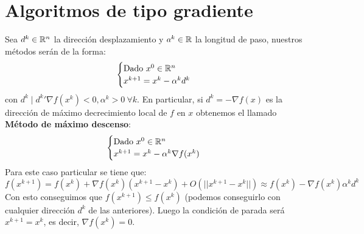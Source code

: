 \documentclass[MIOP.tex]{subfiles}
\begin{document}
\section{Algoritmos de tipo gradiente}
Sea $d^k \in\mathbb{R}^n$ la dirección desplazamiento y $a^k \in \mathbb{R}$ la longitud de paso, nuestros métodos serán de la forma:
\[
\begin{cases}
\text{Dado $x^0\in \mathbb{R}^n$}\\
x^{k+1} = x^k - \alpha^k d^k
\end{cases}
\]
con $d^k\mid {d^k}'\nabla f(x^k)<0, \alpha^k>0\ \forall k$. En particular, si $d^k=-\nabla f(x)$ es la dirección de máximo decrecimiento local de $f$ en $x$ obtenemos el llamado \textbf{Método de máximo descenso}:
\[
\begin{cases}
\text{Dado $x^0\in \mathbb{R}^n$}\\
x^{k+1} = x^k - \alpha^k \nabla f(x^k)
\end{cases}
\]
Para este caso particular se tiene que:
\[
f(x^{k+1})=f(x^k)+\nabla f(x^k)(x^{k+1}-x^k) + O(||x^{k+1}-x^k||) \approx f(x^k)-\nabla f(x^k)\alpha^k d^k
\]
Con esto conseguimos que $f(x^{k+1})\leq f(x^k)$ (podemos conseguirlo con cualquier dirección $d^k$ de las anteriores). Luego la condición de parada será $x^{k+1}=x^k$, es decir, $\nabla f(x^k)=0$. 
\end{document}
